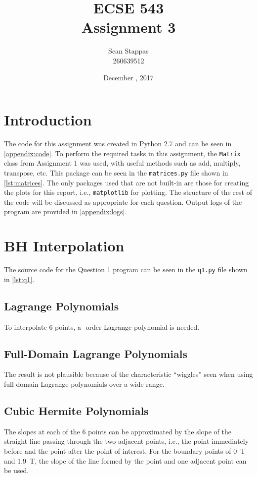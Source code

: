 \documentclass[a4paper,titlepage]{article}
\title{\textbf{ECSE 543 \\ Assignment 3}}
\author{Sean Stappas \\ 260639512}
\date{December \nth{7}, 2017}
\begin{document}
	\sloppy
	\maketitle
	
	\tableofcontents
	
	
	\twocolumn
	
	\section*{Introduction}
	The code for this assignment was created in Python 2.7 and can be seen in \autoref{appendix:code}. To perform the required tasks in this assignment, the \texttt{Matrix} class from Assignment 1 was used, with useful methods such as add, multiply, transpose, etc. This package can be seen in the \texttt{matrices.py} file shown in \autoref{lst:matrices}. The only packages used that are not built-in are those for creating the plots for this report, i.e., \texttt{matplotlib} for plotting. The structure of the rest of the code will be discussed as appropriate for each question. Output logs of the program are provided in \autoref{appendix:logs}.
	
	
	\section{BH Interpolation}
	The source code for the Question 1 program can be seen in the \texttt{q1.py} file shown in \cref{lst:q1}.
	
	\subsection{Lagrange Polynomials}
	To interpolate 6 points, a -order Lagrange polynomial is needed.
	
	
	\subsection{Full-Domain Lagrange Polynomials}
	
	The result is not plausible because of the characteristic ``wiggles'' seen when using full-domain Lagrange polynomials over a wide range.
	
	\subsection{Cubic Hermite Polynomials}
	The slopes at each of the 6 points can be approximated by the slope of the straight line passing through the two adjacent points, i.e., the point immediately before and the point after the point of interest. For the boundary points of \SI{0}{\tesla} and \SI{1.9}{\tesla}, the slope of the line formed by the point and one adjacent point can be used.
	
\end{document}
